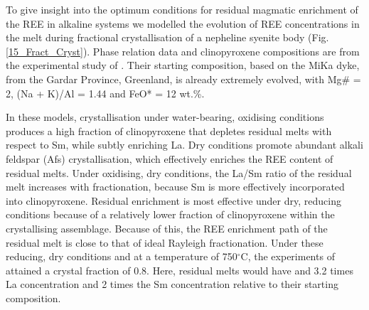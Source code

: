 \documentclass[review,authoryear,12pt]{elsarticle}
\newcommand{\dgCs}{$^\circ$C}
\begin{document}
To give insight into the optimum conditions for residual magmatic enrichment of the REE in alkaline systems we modelled the evolution of REE concentrations in the melt during fractional crystallisation of a nepheline syenite body (Fig. \ref{15_Fract_Cryst}). Phase relation data and clinopyroxene compositions are from the experimental study of \citet[][]{Giehl2013}. Their starting composition, based on the MiKa dyke, from the Gardar Province, Greenland, is already extremely evolved, with Mg\# = 2, (Na + K)/Al = 1.44 and FeO* = 12 wt.\%.
		
		In these models, crystallisation under water-bearing, oxidising conditions produces a high fraction of clinopyroxene that depletes residual melts with respect to Sm, while subtly enriching La. 
	Dry conditions promote abundant alkali feldspar (Afs) crystallisation, which effectively enriches the REE content of residual melts. Under oxidising, dry conditions, the La/Sm ratio of the residual melt increases with fractionation, because Sm is more effectively incorporated into clinopyroxene.
Residual enrichment is most effective under dry, reducing conditions because of a relatively lower fraction of clinopyroxene within the crystallising assemblage. Because of this, the REE enrichment path of the residual melt is close to that of ideal Rayleigh fractionation.  
	Under these reducing, dry conditions and at a temperature of 750\dgCs, the experiments of \citet{Giehl2013} attained a crystal fraction of 0.8. Here, residual melts would have and 3.2 times La concentration and 2 times the Sm concentration relative to their starting composition. 


\end{document}
